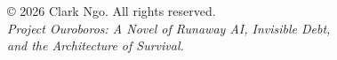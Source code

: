 \vspace*{\fill}
\begin{center}
© 2026 Clark Ngo. All rights reserved.\\[1em]
\textit{Project Ouroboros: A Novel of Runaway AI, Invisible Debt,\\and the Architecture of Survival.}
\end{center}
\vspace*{\fill}
\clearpage
